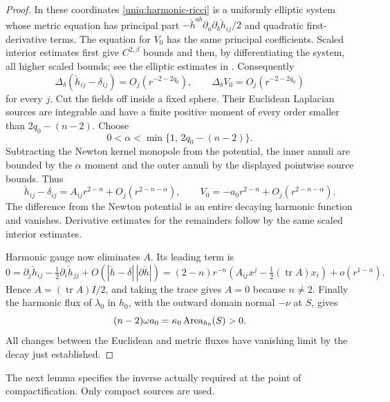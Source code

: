 \begin{proof}
In these coordinates \eqref{uniq:harmonic-ricci} is a uniformly
elliptic system whose metric equation has principal part
$-\check h^{ab}\partial_a\partial_b\check h_{ij}/2$ and quadratic
first-derivative terms. The equation for $V_0$ has the same principal
coefficients. Scaled interior estimates first give $C^{2,\beta}$
bounds and then, by differentiating the system, all higher scaled
bounds; see the elliptic estimates in \cite{GilbargTrudinger2001}.
Consequently
\[
 \Delta_\delta(\check h_{ij}-\delta_{ij})
       =O_j(r^{-2-2q_0}),\qquad
 \Delta_\delta V_0=O_j(r^{-2-2q_0})
\]
for every $j$. Cut the fields off inside a fixed sphere. Their
Euclidean Laplacian sources are integrable and have a finite positive
moment of every order smaller than $2q_0-(n-2)$. Choose
\[
 0<\alpha<\min\{1,\,2q_0-(n-2)\}.
\]
Subtracting the Newton kernel monopole from the potential, the inner
annuli are bounded by the $\alpha$ moment and the outer annuli by
the displayed pointwise source bounds. Thus
\[
 \check h_{ij}-\delta_{ij}=A_{ij}r^{2-n}
                         +O_j(r^{2-n-\alpha}),\qquad
 V_0=-a_0r^{2-n}+O_j(r^{2-n-\alpha}).
\]
The difference from the Newton potential is an entire decaying
harmonic function and vanishes. Derivative estimates for the
remainders follow by the same scaled interior estimates.

Harmonic gauge now eliminates $A$. Its leading term is
\[
 0=\partial_j\check h_{ij}
       -\tfrac12\partial_i\check h_{jj}
       +O(|\check h-\delta|\,|\partial\check h|)
  =(2-n)r^{-n}
    \left(A_{ij}x^j-\tfrac12(\operatorname{tr}A)x_i\right)
    +o(r^{1-n}).
\]
Hence $A=(\operatorname{tr}A)I/2$, and taking the trace gives
$A=0$ because $n\ne2$. Finally the harmonic flux of $\lambda_0$
in $h_0$, with the outward domain normal $-\nu$ at $S$, gives
\begin{equation}\label{uniq:capacity-flux}
 (n-2)\omega a_0=\kappa_0\operatorname{Area}_{h_0}(S)>0.
\end{equation}
All changes between the Euclidean and metric fluxes have vanishing
limit by the decay just established.
\end{proof}

The next lemma specifies the inverse actually required at the point
of compactification. Only compact sources are used.

